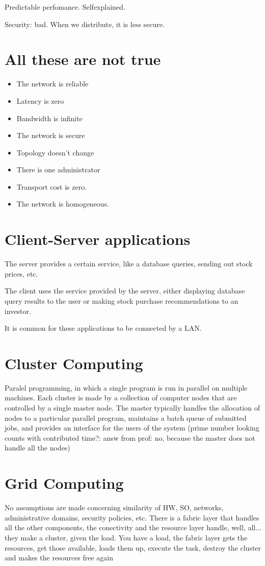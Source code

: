 Predictable perfomance. Selfexplained.

Security: bad. When we distribute, it is less secure.

\section{All these are not true}
\begin{itemize}
\item The network is reliable
\item Latency is zero
\item Bandwidth is infinite
\item The network is secure
\item Topology doesn't change
\item There is one administrator
\item Transport cost is zero.
\item The network is homogeneous. 
\end{itemize}

\section{Client-Server applications}

The server provides a certain service, like a database queries, sending out stock prices, etc.

The client uses the service provided by the server, either displaying database query results to the user or making stock purchase recommendations to an investor.

It is common for these applications to be connected by a LAN.

\section{Cluster Computing}

Paralel programming, in which a single program is run in parallel on multiple machines. Each cluster is made by a collection of computer nodes that are controlled by a single master node. The master typically handles the allocation of nodes to a particular parallel program, maintains a batch queue of submitted jobs, and provides an interface for the users of the system (prime number looking counts with contributed time?: answ from prof: no, because the master does not handle all the nodes)

\section{Grid Computing}
No assumptions are made concerning similarity of HW, SO, networks, administrative domains, security policies, etc. There is a fabric layer that handles all the other components, the conectivity and the resource layer handle, well, all... they make a cluster, given the load. You have a load, the fabric layer gets the resources, get those available, loads them up, execute the task, destroy the cluster and makes the resources free again

